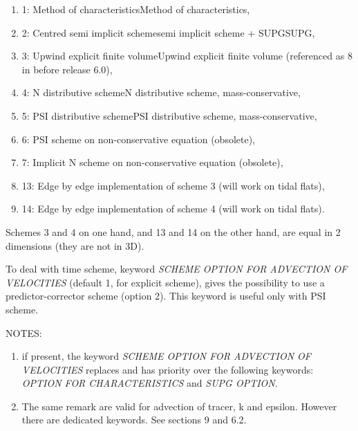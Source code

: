 \documentclass{article} %
\begin{document}
\begin{enumerate}
\item  1: Method of characteristicsMethod of characteristics,

\item  2: Centred semi implicit schemesemi implicit scheme + SUPGSUPG,

\item  3:  Upwind explicit finite volumeUpwind explicit finite volume (referenced as 8 in before release 6.0),

\item  4: N distributive schemeN distributive scheme, mass-conservative,

\item  5:  PSI distributive schemePSI distributive scheme, mass-conservative,

\item  6:  PSI scheme on non-conservative equation (obsolete),

\item  7: Implicit N scheme on non-conservative equation (obsolete),

\item  13: Edge by edge implementation of scheme 3 (will work on tidal flats),

\item  14: Edge by edge implementation of scheme 4 (will work on tidal flats).
\end{enumerate}

 Schemes 3 and 4 on one hand, and 13 and 14 on the other hand, are equal in 2 dimensions (they are not in 3D).

 To deal with time scheme, keyword \textit{SCHEME OPTION FOR ADVECTION OF VELOCITIES} (default 1, for explicit scheme), gives the possibility to use a predictor-corrector scheme (option 2). This keyword is useful only with PSI scheme.

 NOTES:

\begin{enumerate}
\item  if present, the keyword \textit{SCHEME OPTION FOR ADVECTION OF VELOCITIES} replaces and has priority over the following keywords: \textit{OPTION FOR CHARACTERISTICS} and \textit{SUPG OPTION}.

\item  The same remark are valid for advection of tracer, k and epsilon. However there are dedicated keywords. See sections 9 and 6.2.
\end{enumerate}
\end{document}
